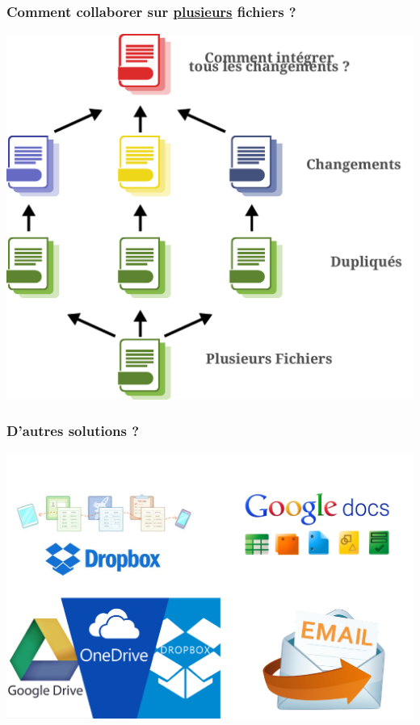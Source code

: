\documentclass[table,tikz,12pt,svgnames]{beamer}
\begin{document}
\begin{frame}
	\frametitle{Comment collaborer sur \underline{plusieurs} fichiers ? }
	\begin{block}{}
    \begin{adjustwidth}{-0.5cm}{-0.5cm}{}
		\begin{center}
		{\includegraphics[scale=0.38]{images/file_share_many.pdf}}
		\end{center}
	\end{adjustwidth}
	\end{block}
\end{frame}


\begin{frame}
	\frametitle{D'autres solutions ? }
	\vspace{-4em}
	\begin{block}{}
    \begin{adjustwidth}{-0.5cm}{-0.5cm}{}
		\begin{center}
		{\includegraphics[scale=0.43]{images/services.pdf}}
		\end{center}
	\end{adjustwidth}
	\end{block}
\end{frame}
\end{document}
